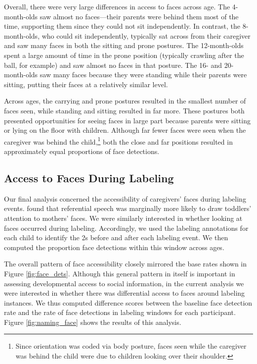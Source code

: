 \documentclass[man,noapacite]{apa2}
\begin{document}
Overall, there were very large differences in access to faces across age. The 4-month-olds saw almost no faces---their parents were behind them most of the time, supporting them since they could not sit independently. In contrast, the 8-month-olds, who could sit independently, typically sat across from their caregiver and saw many faces in both the sitting and prone postures. The 12-month-olds spent a large amount of time in the prone position (typically crawling after the ball, for example) and saw almost no faces in that posture. The 16- and 20-month-olds saw many faces because they were standing while their parents were sitting, putting their faces at a relatively similar level.

Across ages, the carrying and prone postures resulted in the smallest number of faces seen, while standing and sitting resulted in far more. These postures both presented opportunities for seeing faces in large part because parents were sitting or lying on the floor with children. Although far fewer faces were seen when the caregiver was behind the child,\footnote{Since orientation was coded via body posture, faces seen while the caregiver was behind the child were due to children looking over their shoulder.} both the close and far positions resulted in approximately equal proportions of face detections. 

\subsection{Access to Faces During Labeling}

Our final analysis concerned the accessibility of caregivers' faces during labeling events.  found that referential speech was marginally more likely to draw toddlers' attention to mothers' faces. We were similarly interested in whether looking at faces occurred during labeling. Accordingly, we used the labeling annotations for each child to identify the 2s before and after each labeling event. We then computed the proportion face detections within this window across ages. 

The overall pattern of face accessibility closely mirrored the base rates shown in Figure \ref{fig:face_dets}. Although this general pattern in itself is important in assessing developmental access to social information, in the current analysis we were interested in whether there was differential access to faces around labeling instances. We thus computed difference scores between the baseline face detection rate and the rate of face detections in labeling windows for each participant. Figure \ref{fig:naming_face} shows the results of this analysis. 
\end{document}
